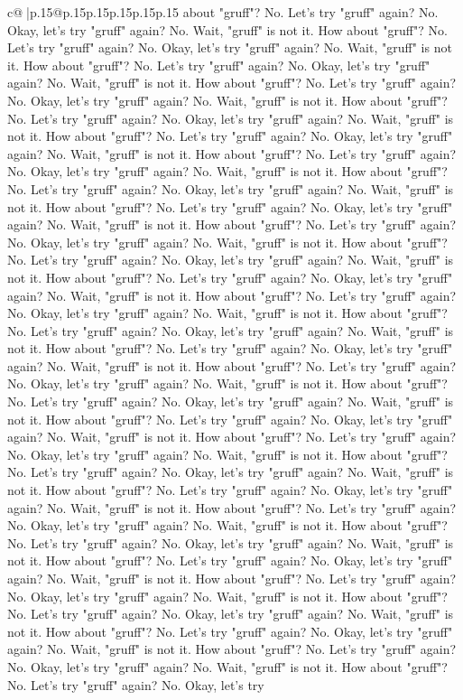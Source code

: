 \documentclass{article}
\begin{document}
{\begin{supertabular}{c@{$\;$}|p{.15\linewidth}@{}p{.15\linewidth}p{.15\linewidth}p{.15\linewidth}p{.15\linewidth}p{.15\linewidth}}
{{{about "gruff"? No. Let's try "gruff" again? No. Okay, let's try "gruff" again? No. Wait, "gruff" is not it. How about "gruff"? No. Let's try "gruff" again? No. Okay, let's try "gruff" again? No. Wait, "gruff" is not it. How about "gruff"? No. Let's try "gruff" again? No. Okay, let's try "gruff" again? No. Wait, "gruff" is not it. How about "gruff"? No. Let's try "gruff" again? No. Okay, let's try "gruff" again? No. Wait, "gruff" is not it. How about "gruff"? No. Let's try "gruff" again? No. Okay, let's try "gruff" again? No. Wait, "gruff" is not it. How about "gruff"? No. Let's try "gruff" again? No. Okay, let's try "gruff" again? No. Wait, "gruff" is not it. How about "gruff"? No. Let's try "gruff" again? No. Okay, let's try "gruff" again? No. Wait, "gruff" is not it. How about "gruff"? No. Let's try "gruff" again? No. Okay, let's try "gruff" again? No. Wait, "gruff" is not it. How about "gruff"? No. Let's try "gruff" again? No. Okay, let's try "gruff" again? No. Wait, "gruff" is not it. How about "gruff"? No. Let's try "gruff" again? No. Okay, let's try "gruff" again? No. Wait, "gruff" is not it. How about "gruff"? No. Let's try "gruff" again? No. Okay, let's try "gruff" again? No. Wait, "gruff" is not it. How about "gruff"? No. Let's try "gruff" again? No. Okay, let's try "gruff" again? No. Wait, "gruff" is not it. How about "gruff"? No. Let's try "gruff" again? No. Okay, let's try "gruff" again? No. Wait, "gruff" is not it. How about "gruff"? No. Let's try "gruff" again? No. Okay, let's try "gruff" again? No. Wait, "gruff" is not it. How about "gruff"? No. Let's try "gruff" again? No. Okay, let's try "gruff" again? No. Wait, "gruff" is not it. How about "gruff"? No. Let's try "gruff" again? No. Okay, let's try "gruff" again? No. Wait, "gruff" is not it. How about "gruff"? No. Let's try "gruff" again? No. Okay, let's try "gruff" again? No. Wait, "gruff" is not it. How about "gruff"? No. Let's try "gruff" again? No. Okay, let's try "gruff" again? No. Wait, "gruff" is not it. How about "gruff"? No. Let's try "gruff" again? No. Okay, let's try "gruff" again? No. Wait, "gruff" is not it. How about "gruff"? No. Let's try "gruff" again? No. Okay, let's try "gruff" again? No. Wait, "gruff" is not it. How about "gruff"? No. Let's try "gruff" again? No. Okay, let's try "gruff" again? No. Wait, "gruff" is not it. How about "gruff"? No. Let's try "gruff" again? No. Okay, let's try "gruff" again? No. Wait, "gruff" is not it. How about "gruff"? No. Let's try "gruff" again? No. Okay, let's try "gruff" again? No. Wait, "gruff" is not it. How about "gruff"? No. Let's try "gruff" again? No. Okay, let's try "gruff" again? No. Wait, "gruff" is not it. How about "gruff"? No. Let's try "gruff" again? No. Okay, let's try "gruff" again? No. Wait, "gruff" is not it. How about "gruff"? No. Let's try "gruff" again? No. Okay, let's try "gruff" again? No. Wait, "gruff" is not it. How about "gruff"? No. Let's try "gruff" again? No. Okay, let's try "gruff" again? No. Wait, "gruff" is not it. How about "gruff"? No. Let's try "gruff" again? No. Okay, let's try "gruff" again? No. Wait, "gruff" is not it. How about "gruff"? No. Let's try "gruff" again? No. Okay, let's try }}}
\end{supertabular}}
\end{document}
